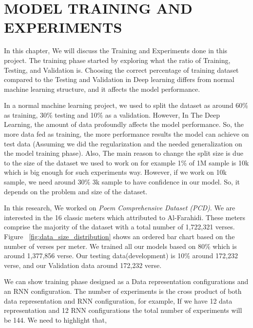\chapter{\uppercase{Model Training and Experiments}}

In this chapter, We will discuss the Training and Experiments done in this project. The training phase started by exploring what the ratio of Training, Testing, and Validation is. Choosing the correct percentage of training dataset compared to the Testing and Validation in Deep learning differs from normal machine learning structure, and it affects the model performance.

In a normal machine learning project, we used to split the dataset as around 60\% as training, 30\% testing and 10\% as a validation. However, In The Deep Learning, the amount of data profoundly affects the model performance. So, the more data fed as training, the more performance results the model can achieve on test data (Assuming we did the regularization and the needed generalization on the model training phase). Also, The main reason to change the split size is due to the size of the dataset we used to work on for example 1\% of 1M sample is 10k which is big enough for such experiments way. However, if we work on 10k sample, we need around 30\% 3k sample to have confidence in our model. So, it depends on the problem and size of the dataset.

In this research, We worked on \textit{Poem Comprehensive Dataset (PCD)}\cite{ArabicpoetryDS}. We are interested in the 16 classic meters which attributed to Al-Farahidi. These meters comprise the majority of the dataset with a total number of 1,722,321 verses. Figure ~\ref{fig:data_size_distribution} shows an ordered bar chart based on the number of verses per meter. We trained all our models based on 80\% which is around 1,377,856 verse. Our testing data(development) is 10\% around 172,232 verse, and our Validation data around 172,232 verse.

We can show training phase designed as a Data representation configurations and an RNN configuration. The number of experiments is the cross product of both data representation and RNN configuration, for example, If we have 12 data representation and 12 RNN configurations the total number of experiments will be 144. We need to highlight that,

